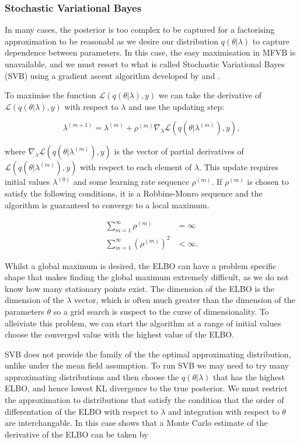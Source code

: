 \documentclass{article}\usepackage[]{graphicx}\usepackage[]{color}
\numberwithin{equation}{section}
\begin{document}
\subsubsection{Stochastic Variational Bayes}

In many cases, the posterior is too complex to be captured for a factorising approximation to be reasonabl as we desire our distribution $q(\theta | \lambda)$ to capture dependence between parameters. In this case, the easy maximisation in MFVB is unavailable, and we must resort to what is called Stochastic Variational Bayes (SVB) using a gradient ascent algorithm developed by \citet{Paisley2012} and \citet{Ranganath2014}.

To maximise the function $\mathcal{L}(q(\theta | \lambda), y)$ we can take the derivative of $\mathcal{L}(q(\theta | \lambda), y)$ with respect to $\lambda$ and use the updating step:

\begin{equation}
\label{SGA1}
\lambda^{(m+1)} = \lambda^{(m)} + \rho^{(m)} \nabla_{\lambda} \mathcal{L}(q(\theta | \lambda^{(m)}), y),
\end{equation}

where $\nabla_{\lambda}\mathcal{L}(q(\theta | \lambda^{(m)}), y)$ is the vector of partial derivatives of $\mathcal{L}(q(\theta | \lambda^{(m)}), y)$ with respect to each element of $\lambda$. This update requires initial values $\lambda^{(0)}$ and some learning rate sequence $\rho^{(m)}$. If $\rho^{(m)}$ is chosen to satisfy the following conditions, it is a Robbins-Monro sequence and the algorithm is guaranteed to converge to a local maximum.

\begin{align}
\sum_{m=1}^{\infty} \rho^{(m)} &=  \infty \\
\sum_{m=1}^{\infty} (\rho^{(m)})^2 &<  \infty.
\end{align}

Whilst a global maximum is desired, the ELBO can have a problem specific shape that makes finding the global maximum extremely difficult, as we do not know how many stationary points exist. The dimension of the ELBO is the dimension of the $\lambda$ vector, which is often much greater than the dimension of the parameters $\theta$ so a grid search is suspect to the curse of dimensionality. To alleiviate this problem, we can start the algorithm at a range of initial values choose the converged value with the highest value of the ELBO. 

SVB does not provide the family of the the optimal approximating distribution, unlike under the mean field assumption. To run SVB we may need to try many approximating distributions and then choose the $q(\theta | \lambda)$ that has the highest ELBO, and hence lowest KL divergence to the true posterior. We must restrict the approximation to distributions that satisfy the condition that the order of differentation of the ELBO with respect to $\lambda$ and integration with respect to $\theta$ are interchangable. In this case \citet{Ranganath2014} shows that a Monte Carlo estimate of the derivative of the ELBO can be taken by
\end{document}
